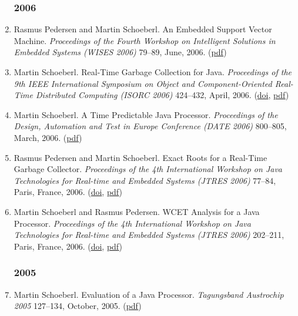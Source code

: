 \begin{enumerate}
\subsubsection*{2006}

\item Rasmus Pedersen and Martin Schoeberl.
 An Embedded Support Vector Machine.
 \emph{Proceedings of the Fourth Workshop on Intelligent Solutions in Embedded Systems (WISES 2006)} 79--89, June, 2006.
(\href{http://www.jopdesign.com/doc/rtsvm_wises2006.pdf}{pdf})

\item Martin Schoeberl.
 Real-Time Garbage Collection for Java.
 \emph{Proceedings of the 9th IEEE International Symposium on Object and Component-Oriented Real-Time Distributed Computing (ISORC 2006)} 424--432, April, 2006.
(\href{http://dx.doi.org/10.1109/ISORC.2006.66}{doi}, \href{http://www.jopdesign.com/doc/rtgc_sched.pdf}{pdf})

\item Martin Schoeberl.
 A Time Predictable Java Processor.
 \emph{Proceedings of the Design, Automation and Test in Europe Conference (DATE 2006)} 800--805, March, 2006.
(\href{http://www.jopdesign.com/doc/jop_wcet.pdf}{pdf})

\item Rasmus Pedersen and Martin Schoeberl.
 Exact Roots for a Real-Time Garbage Collector.
 \emph{Proceedings of the 4th International Workshop on Java Technologies for Real-time and Embedded Systems (JTRES 2006)} 77--84, Paris, France, 2006.
(\href{http://dx.doi.org/10.1145/1167999.1168013}{doi}, \href{http://www.jopdesign.com/doc/gcroots_jtres2006.pdf}{pdf})

\item Martin Schoeberl and Rasmus Pedersen.
 WCET Analysis for a Java Processor.
 \emph{Proceedings of the 4th International Workshop on Java Technologies for Real-time and Embedded Systems (JTRES 2006)} 202--211, Paris, France, 2006.
(\href{http://dx.doi.org/10.1145/1167999.1168033}{doi}, \href{http://www.jopdesign.com/doc/wcet_jtres2006.pdf}{pdf})


\subsubsection*{2005}

\item Martin Schoeberl.
 Evaluation of a Java Processor.
 \emph{Tagungsband Austrochip 2005} 127--134, October, 2005.
(\href{http://www.jopdesign.com/doc/jop_eval.pdf}{pdf})


\end{enumerate}
